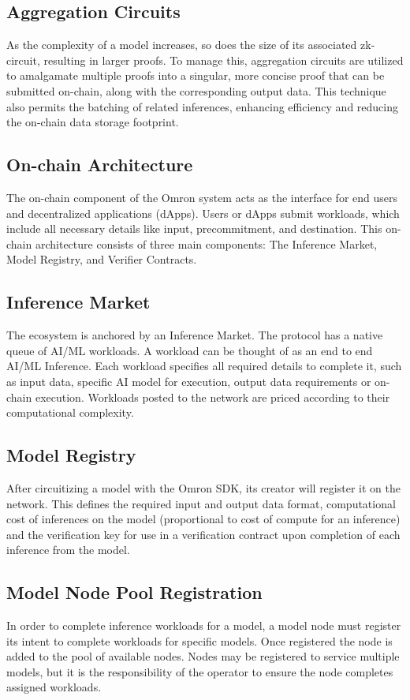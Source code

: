 \documentclass[conference]{IEEEtran}
\begin{document}
\subsection{Aggregation Circuits}
As the complexity of a model increases, so does the size of its associated zk-circuit, resulting in larger proofs. To manage this, aggregation circuits are utilized to amalgamate multiple proofs into a singular, more concise proof that can be submitted on-chain, along with the corresponding output data. This technique also permits the batching of related inferences, enhancing efficiency and reducing the on-chain data storage footprint.

\subsection{On-chain Architecture}
The on-chain component of the Omron system acts as the interface for end users and decentralized applications (dApps).  Users or dApps submit workloads, which include all necessary details like input, precommitment, and destination. This on-chain architecture consists of three main components: The Inference Market, Model Registry, and Verifier Contracts.

\subsection{Inference Market}
The ecosystem is anchored by an Inference Market. The protocol has a native queue of AI/ML workloads. A workload can be thought of as an end to end AI/ML Inference. Each workload specifies all required details to complete it, such as input data, specific AI model for execution, output data requirements or on-chain execution. Workloads posted to the network are priced according to their computational complexity.

\subsection{Model Registry}
After circuitizing a model with the Omron SDK, its creator will register it on the network. This defines the required input and output data format, computational cost of inferences on the model (proportional to cost of compute for an inference) and the verification key for use in a verification contract upon completion of each inference from the model.

\subsection{Model Node Pool Registration}
In order to complete inference workloads for a model, a model node must register its intent to complete workloads for specific models. Once registered the node is added to the pool of available nodes. Nodes may be registered to service multiple models, but it is the responsibility of the operator to ensure the node completes assigned workloads.
\end{document}
